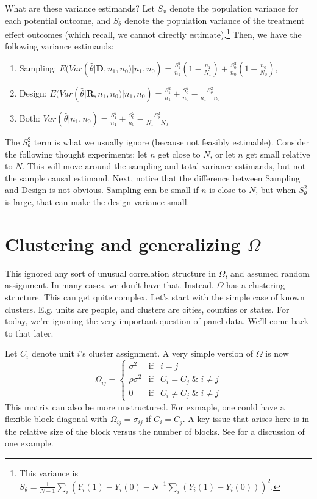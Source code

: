 \documentclass{tufte-handout}
\theoremstyle{break}
\begin{document}
What are these variance estimands? Let $S_{x}$ denote the population variance for each potential outcome, and $S_{\theta}$ denote the population variance of the treatment effect outcomes (which recall, we cannot directly estimate).\footnote{This variance is $S_{\theta} = \frac{1}{N-1}\sum_{i}\left(Y_{i}(1) - Y_{i}(0) - N^{-1}\sum_{i}(Y_{i}(1) -Y_{i}(0))\right)^{2}$.} Then, we have the following variance estimands:
\begin{enumerate}
  \item Sampling: $E(Var(\hat{\theta} | \mathbf{D}, n_{1}, n_{0}) | n_{1}, n_{0}) = \frac{S^{2}_{1}}{n_{1}}\left(1- \frac{n_{1}}{N_{1}}\right) + \frac{S^{2}_{0}}{n_{0}}\left(1- \frac{n_{0}}{N_{0}}\right),$
  \item Design:  $E(Var(\hat{\theta} | \mathbf{R}, n_{1}, n_{0}) | n_{1}, n_{0}) = \frac{S^{2}_{1}}{n_{1}} + \frac{S^{2}_{0}}{n_{0}} - \frac{S^{2}_{\theta}}{n_{1}+n_{0}}    $
  \item Both: $Var(\hat{\theta} | n_{1}, n_{0}) = \frac{S^{2}_{1}}{n_{1}} + \frac{S^{2}_{0}}{n_{0}} - \frac{S^{2}_{\theta}}{N_{1}+N_{0}}    $
\end{enumerate}
The $S^{2}_{\theta}$ term is what we usually ignore (because not feasibly estimable). Consider the following thought experiments: let $n$ get close to $N$, or let $n$ get small relative to $N$. This will move around the sampling and total variance estimands, but not the sample causal estimand. Next, notice that the difference between Sampling and Design is not obvious. Sampling can be small if $n$ is close to $N$, but when $S_{\theta}^{2}$ is large, that can make the design variance small.

\section{Clustering and generalizing $\Omega$}
This ignored any sort of unusual correlation structure in $\Omega$, and assumed random assignment.
 In many cases, we don't have that. Instead, $\Omega$  has a clustering structure. This can get quite complex. Let's start with the simple case of known clusters. E.g. units are people, and clusters are cities, counties or states. For today, we're ignoring the very important question of panel data. We'll come back to that later.

Let $C_{i}$ denote unit $i$'s cluster assignment. A very simple version of $\Omega$ is now
\begin{equation}
  \label{eq:clustering}
\Omega_{ij}  =\left \{\begin{array}{ccc}
      \sigma^{2} &  \text{if}& i = j\\
      \rho\sigma^{2}  & \text{if}&  C_{i} = C_{j} \; \& \; i \not= j\\
      0 & \text{if} & C_{i} \not= C_{j} \; \& \; i \not= j
    \end{array}\right. 
\end{equation}
This matrix can also be more unstructured. For exmaple, one could have a flexible block diagonal with $\Omega_{ij} = \sigma_{ij}$ if $C_{i} = C_{j}$. A key issue that arises here is in the relative size of the block versus the number of blocks. See \citet{hansen2007asymptotic} for a discussion of one example.
\end{document}
